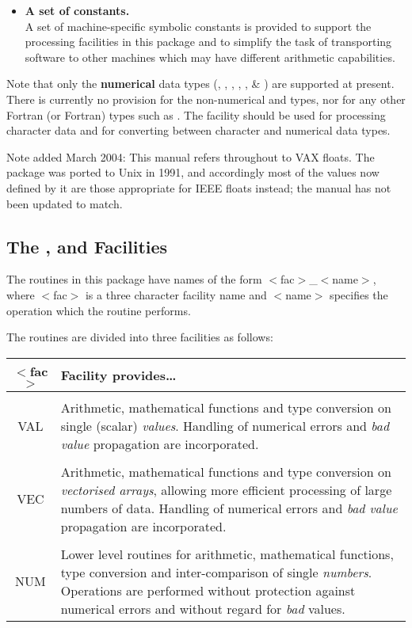 \begin{itemize}
\item {\bf A set of constants.}\\
A set of machine-specific symbolic constants is provided to support the
processing facilities in this package and to simplify the task of
transporting software to other machines which may have different arithmetic 
capabilities.

\end{itemize}

Note that only the {\bf numerical}  data types (,
, , , ,
 \& ) are supported at present. 
There is currently no provision for the non-numerical  and
 types, nor for any other Fortran (or  Fortran) types
such as . 
The  facility should be used for processing character data and for
converting between character and numerical data types. 

Note added March 2004: This manual refers throughout to VAX floats.
The package was ported to Unix in 1991, and accordingly most of the
values now defined by it are those appropriate for IEEE floats
instead; the manual has not been updated to match.

\subsection{The ,  and  Facilities}

The routines in this package have names of the form
\mbox{$<$fac$>$\_$<$name$>$}, where \mbox{$<$fac$>$} is a three character
facility name and \mbox{$<$name$>$} specifies the operation which the
routine performs. 

The routines are divided into three facilities as follows: 

\begin{center}
\begin{tabular}{c|p{33em}}

{\bf $<$fac$>$} & {\bf Facility provides\ldots } \\
\hline
\\
VAL & Arithmetic, mathematical functions and type conversion on single 
(scalar) {\em values}.
Handling of numerical errors and {\em bad value} propagation are
incorporated.\\ 
\\ 
VEC & Arithmetic, mathematical functions and type conversion on {\em
vectorised arrays}, allowing more efficient processing of large numbers of
data. 
Handling of numerical errors and {\em bad value} propagation are
incorporated.\\ 
\\
NUM & Lower level routines for arithmetic, mathematical functions, type
conversion and inter-comparison of single {\em numbers}. 
Operations are performed without protection against numerical errors and
without regard for {\em bad} values.
\\ 
\end{tabular}
\end{center}


